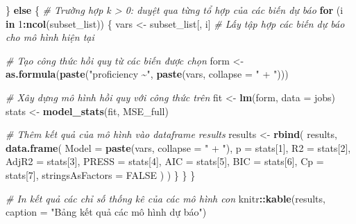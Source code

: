 \documentclass[
]{article}
\newenvironment{Shaded}{\begin{snugshade}}{\end{snugshade}}
\newcommand{\AttributeTok}[1]{\textcolor[rgb]{0.13,0.29,0.53}{#1}}
\newcommand{\CommentTok}[1]{\textcolor[rgb]{0.56,0.35,0.01}{\textit{#1}}}
\newcommand{\ConstantTok}[1]{\textcolor[rgb]{0.56,0.35,0.01}{#1}}
\newcommand{\ControlFlowTok}[1]{\textcolor[rgb]{0.13,0.29,0.53}{\textbf{#1}}}
\newcommand{\DecValTok}[1]{\textcolor[rgb]{0.00,0.00,0.81}{#1}}
\newcommand{\FunctionTok}[1]{\textcolor[rgb]{0.13,0.29,0.53}{\textbf{#1}}}
\newcommand{\NormalTok}[1]{#1}
\newcommand{\OtherTok}[1]{\textcolor[rgb]{0.56,0.35,0.01}{#1}}
\newcommand{\SpecialCharTok}[1]{\textcolor[rgb]{0.81,0.36,0.00}{\textbf{#1}}}
\newcommand{\StringTok}[1]{\textcolor[rgb]{0.31,0.60,0.02}{#1}}
\begin{document}
\begin{Shaded}
\begin{Highlighting}[]
\NormalTok{  \} }\ControlFlowTok{else}\NormalTok{ \{}
    \CommentTok{\# Trường hợp k \textgreater{} 0: duyệt qua từng tổ hợp của các biến dự báo}
    \ControlFlowTok{for}\NormalTok{ (i }\ControlFlowTok{in} \DecValTok{1}\SpecialCharTok{:}\FunctionTok{ncol}\NormalTok{(subset\_list)) \{}
\NormalTok{      vars }\OtherTok{\textless{}{-}}\NormalTok{ subset\_list[, i]  }\CommentTok{\# Lấy tập hợp các biến dự báo cho mô hình hiện tại}
      
      \CommentTok{\# Tạo công thức hồi quy từ các biến được chọn}
\NormalTok{      form }\OtherTok{\textless{}{-}} \FunctionTok{as.formula}\NormalTok{(}\FunctionTok{paste}\NormalTok{(}\StringTok{"proficiency \textasciitilde{}"}\NormalTok{, }\FunctionTok{paste}\NormalTok{(vars, }\AttributeTok{collapse =} \StringTok{" + "}\NormalTok{)))}
      
      \CommentTok{\# Xây dựng mô hình hồi quy với công thức trên}
\NormalTok{      fit }\OtherTok{\textless{}{-}} \FunctionTok{lm}\NormalTok{(form, }\AttributeTok{data =}\NormalTok{ jobs)}
\NormalTok{      stats }\OtherTok{\textless{}{-}} \FunctionTok{model\_stats}\NormalTok{(fit, MSE\_full)}
      
      \CommentTok{\# Thêm kết quả của mô hình vào dataframe results}
\NormalTok{      results }\OtherTok{\textless{}{-}} \FunctionTok{rbind}\NormalTok{(}
\NormalTok{        results,}
        \FunctionTok{data.frame}\NormalTok{(}
          \AttributeTok{Model =} \FunctionTok{paste}\NormalTok{(vars, }\AttributeTok{collapse =} \StringTok{" + "}\NormalTok{),}
          \AttributeTok{p     =}\NormalTok{ stats[}\DecValTok{1}\NormalTok{],}
          \AttributeTok{R2    =}\NormalTok{ stats[}\DecValTok{2}\NormalTok{],}
          \AttributeTok{AdjR2 =}\NormalTok{ stats[}\DecValTok{3}\NormalTok{],}
          \AttributeTok{PRESS =}\NormalTok{ stats[}\DecValTok{4}\NormalTok{],}
          \AttributeTok{AIC   =}\NormalTok{ stats[}\DecValTok{5}\NormalTok{],}
          \AttributeTok{BIC   =}\NormalTok{ stats[}\DecValTok{6}\NormalTok{],}
          \AttributeTok{Cp    =}\NormalTok{ stats[}\DecValTok{7}\NormalTok{],}
          \AttributeTok{stringsAsFactors =} \ConstantTok{FALSE}
\NormalTok{        )}
\NormalTok{      )}
\NormalTok{    \}}
\NormalTok{  \}}
\NormalTok{\}}
\end{Highlighting}
\end{Shaded}

\begin{Shaded}
\begin{Highlighting}[]
\CommentTok{\# In kết quả các chỉ số thống kê của các mô hình con}
\NormalTok{knitr}\SpecialCharTok{::}\FunctionTok{kable}\NormalTok{(results, }\AttributeTok{caption =} \StringTok{"Bảng kết quả các mô hình dự báo"}\NormalTok{)}
\end{Highlighting}
\end{Shaded}
\end{document}
